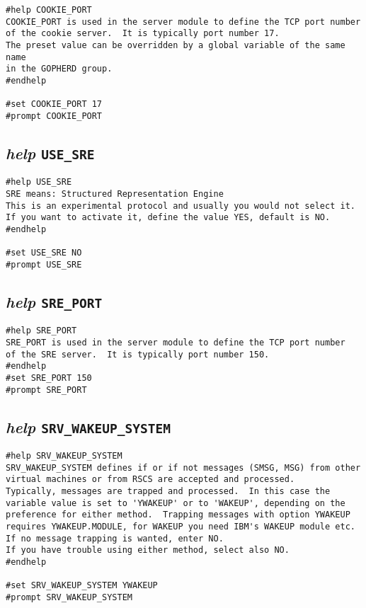 \begin{verbatim}
#help COOKIE_PORT
COOKIE_PORT is used in the server module to define the TCP port number
of the cookie server.  It is typically port number 17.
The preset value can be overridden by a global variable of the same name
in the GOPHERD group.
#endhelp

#set COOKIE_PORT 17
#prompt COOKIE_PORT
\end{verbatim}

\subsection{{\sl{help}} {\tt USE\_SRE}}

\def\LPtopD{{\sl{help}} {\tt USE\_SRE}}

\def\LPtopF{~}

\begin{verbatim}
#help USE_SRE
SRE means: Structured Representation Engine
This is an experimental protocol and usually you would not select it.
If you want to activate it, define the value YES, default is NO.
#endhelp

#set USE_SRE NO
#prompt USE_SRE
\end{verbatim}

\subsection{{\sl{help}} {\tt SRE\_PORT}}

\def\LPtopD{{\sl{help}} {\tt SRE\_PORT}}

\def\LPtopF{~}

\begin{verbatim}
#help SRE_PORT
SRE_PORT is used in the server module to define the TCP port number
of the SRE server.  It is typically port number 150.
#endhelp
#set SRE_PORT 150
#prompt SRE_PORT
\end{verbatim}

\subsection{{\sl{help}} {\tt SRV\_WAKEUP\_SYSTEM}}

\def\LPtopD{{\sl{help}} {\tt SRV\_WAKEUP\_SYSTEM}}

\def\LPtopF{~}

\begin{verbatim}
#help SRV_WAKEUP_SYSTEM
SRV_WAKEUP_SYSTEM defines if or if not messages (SMSG, MSG) from other
virtual machines or from RSCS are accepted and processed.
Typically, messages are trapped and processed.  In this case the
variable value is set to 'YWAKEUP' or to 'WAKEUP', depending on the
preference for either method.  Trapping messages with option YWAKEUP
requires YWAKEUP.MODULE, for WAKEUP you need IBM's WAKEUP module etc.
If no message trapping is wanted, enter NO.
If you have trouble using either method, select also NO.
#endhelp

#set SRV_WAKEUP_SYSTEM YWAKEUP
#prompt SRV_WAKEUP_SYSTEM
\end{verbatim}

